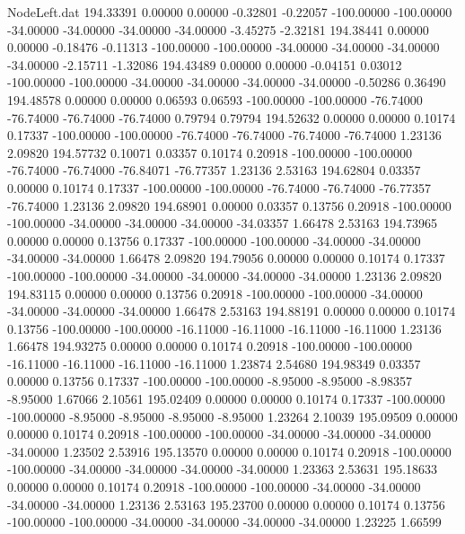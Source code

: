 \begin{filecontents}{NodeLeft.dat}
 194.33391    0.00000    0.00000    -0.32801   -0.22057 -100.00000 -100.00000  -34.00000  -34.00000  -34.00000  -34.00000   -3.45275   -2.32181
 194.38441    0.00000    0.00000    -0.18476   -0.11313 -100.00000 -100.00000  -34.00000  -34.00000  -34.00000  -34.00000   -2.15711   -1.32086
 194.43489    0.00000    0.00000    -0.04151    0.03012 -100.00000 -100.00000  -34.00000  -34.00000  -34.00000  -34.00000   -0.50286    0.36490
 194.48578    0.00000    0.00000     0.06593    0.06593 -100.00000 -100.00000  -76.74000  -76.74000  -76.74000  -76.74000    0.79794    0.79794
 194.52632    0.00000    0.00000     0.10174    0.17337 -100.00000 -100.00000  -76.74000  -76.74000  -76.74000  -76.74000    1.23136    2.09820
 194.57732    0.10071    0.03357     0.10174    0.20918 -100.00000 -100.00000  -76.74000  -76.74000  -76.84071  -76.77357    1.23136    2.53163
 194.62804    0.03357    0.00000     0.10174    0.17337 -100.00000 -100.00000  -76.74000  -76.74000  -76.77357  -76.74000    1.23136    2.09820
 194.68901    0.00000    0.03357     0.13756    0.20918 -100.00000 -100.00000  -34.00000  -34.00000  -34.00000  -34.03357    1.66478    2.53163
 194.73965    0.00000    0.00000     0.13756    0.17337 -100.00000 -100.00000  -34.00000  -34.00000  -34.00000  -34.00000    1.66478    2.09820
 194.79056    0.00000    0.00000     0.10174    0.17337 -100.00000 -100.00000  -34.00000  -34.00000  -34.00000  -34.00000    1.23136    2.09820
 194.83115    0.00000    0.00000     0.13756    0.20918 -100.00000 -100.00000  -34.00000  -34.00000  -34.00000  -34.00000    1.66478    2.53163
 194.88191    0.00000    0.00000     0.10174    0.13756 -100.00000 -100.00000  -16.11000  -16.11000  -16.11000  -16.11000    1.23136    1.66478
 194.93275    0.00000    0.00000     0.10174    0.20918 -100.00000 -100.00000  -16.11000  -16.11000  -16.11000  -16.11000    1.23874    2.54680
 194.98349    0.03357    0.00000     0.13756    0.17337 -100.00000 -100.00000   -8.95000   -8.95000   -8.98357   -8.95000    1.67066    2.10561
 195.02409    0.00000    0.00000     0.10174    0.17337 -100.00000 -100.00000   -8.95000   -8.95000   -8.95000   -8.95000    1.23264    2.10039
 195.09509    0.00000    0.00000     0.10174    0.20918 -100.00000 -100.00000  -34.00000  -34.00000  -34.00000  -34.00000    1.23502    2.53916
 195.13570    0.00000    0.00000     0.10174    0.20918 -100.00000 -100.00000  -34.00000  -34.00000  -34.00000  -34.00000    1.23363    2.53631
 195.18633    0.00000    0.00000     0.10174    0.20918 -100.00000 -100.00000  -34.00000  -34.00000  -34.00000  -34.00000    1.23136    2.53163
 195.23700    0.00000    0.00000     0.10174    0.13756 -100.00000 -100.00000  -34.00000  -34.00000  -34.00000  -34.00000    1.23225    1.66599

\end{filecontents}
